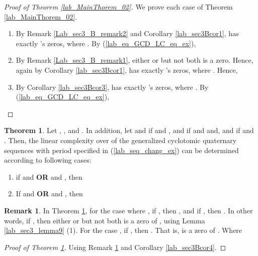 \documentclass{mcom-l}
\theoremstyle{definition}
\newtheorem{sec3_B_remark3}[sec3_remark1]{Remark}
\newtheorem{sec3thm2aux1}[sec3thm1]{Theorem}
\numberwithin{equation}{section}
\begin{document}
      \begin{proof}[Proof of Theorem \ref{lab_MainThorem_02}]
      We prove each case of Theorem \ref{lab_MainThorem_02}.
      \begin{enumerate}
      \item By Remark \ref{Lab_sec3_B_remark2} and Corollary \ref{lab_sec3Bcor1},  has exactly 's zeros, where . By (\ref{lab_eq_GCD_LC_eq_ex}), 
      
      \item By Remark \ref{Lab_sec3_B_remark1}, either  or  but not both is a zero. Hence, again by Corollary \ref{lab_sec3Bcor1},  has exactly 's zeros, where . Hence,
      
      \item By Corollary \ref{lab_sec3Bcor3},  has exactly 's zeros, where . By (\ref{lab_eq_GCD_LC_eq_ex}), 
      
      \end{enumerate}
      \end{proof}
    
\begin{sec3thm2aux1}\label{lab_sec3thm2aux1}
  Let , ,  and . In addition, let  and  if  and ,  and  if  and  and,  and  if  and . Then, the linear complexity over  of the generalized cyclotomic quaternary sequences with period  specified in (\ref{lab_seq_chang_ex}) can be determined according to following cases:
  \begin{enumerate} \item if  and   \textbf{OR}  and , then
    
\item If  and   \textbf{OR}  and , then
     
\end{enumerate}
  \end{sec3thm2aux1}
  
  \begin{sec3_B_remark3}\label{Lab_sec3_B_remark3}
  In Theorem \ref{lab_sec3thm2aux1}, for the case where , if , then , and if , then . In  other words, if , then either  or  but not both is a zero of  , using Lemma \ref{lab_sec3_lemma9} (1). For the case , if , then . That is,  is a zero of . Where 
  \end{sec3_B_remark3}
  \begin{proof}[Proof of Theorem \ref{lab_sec3thm2aux1}]
  Using Remark \ref{Lab_sec3_B_remark3} and Corollary \ref{lab_sec3Bcor4}.
  \end{proof}
  
\end{document}
